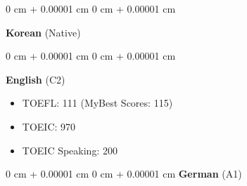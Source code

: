 \documentclass[10pt, letterpaper]{article}
\newenvironment{highlights}{
    \begin{itemize}[
        topsep=0.10 cm,
        parsep=0.10 cm,
        partopsep=0pt,
        itemsep=0pt,
        leftmargin=0 cm + 10pt
    ]
}{
    \end{itemize}
} %
\newenvironment{onecolentry}{
    \begin{adjustwidth}{
        0 cm + 0.00001 cm
    }{
        0 cm + 0.00001 cm
    }
}{
    \end{adjustwidth}
} %
\begin{document}
        \begin{onecolentry}
        \textbf{Korean} (Native)  
        \end{onecolentry}
         \vspace{0.2 cm}
        \begin{onecolentry}
        \textbf{English} (C2) \\
            \begin{highlights}
                \item TOEFL: 111 (MyBest Scores: 115)
                \item TOEIC: 970
                \item TOEIC Speaking: 200
            \end{highlights}
        \end{onecolentry}
         \vspace{0.2 cm}
        \begin{onecolentry}{}
        \textbf{German} (A1) \\
        \end{onecolentry}
\end{document}
